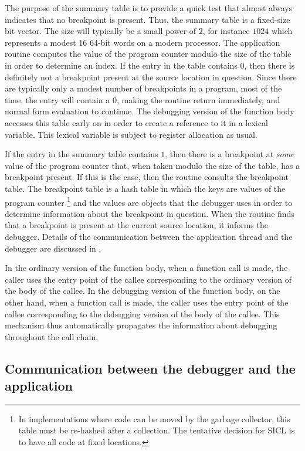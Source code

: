 The purpose of the summary table is to provide a quick test that
almost always indicates that no breakpoint is present.  Thus, the
summary table is a fixed-size bit vector.  The size will typically be
a small power of $2$, for instance $1024$ which represents a modest 16
64-bit words on a modern processor.  The application routine computes
the value of the program counter modulo the size of the table in order
to determine an index.  If the entry in the table contains $0$, then
there is definitely not a breakpoint present at the source location in
question.  Since there are typically only a modest number of
breakpoints in a program, most of the time, the entry will contain a
$0$, making the routine return immediately, and normal form evaluation
to continue.  The debugging version of the function body accesses this
table early on in order to create a reference to it in a lexical
variable.  This lexical variable is subject to register allocation as
usual.

If the entry in the summary table contains $1$, then there is a
breakpoint at \emph{some} value of the program counter that, when
taken modulo the size of the table, has a breakpoint present.  If this
is the case, then the routine consults the breakpoint table.
The breakpoint table is a hash table in which the keys are values of
the program counter%
\footnote{In implementations where code can be moved by the garbage
  collector, this table must be re-hashed after a collection.  The
  tentative decision for SICL is to have all code at fixed locations.}
and the values are objects that the debugger uses in order to
determine information about the breakpoint in question.  When the
routine finds that a breakpoint is present at the current source
location, it informs the debugger.  Details of the communication
between the application thread and the debugger are discussed in
.

In the ordinary version of the function body, when a function call is
made, the caller uses the entry point of the callee corresponding to
the ordinary version of the body of the callee.  In the debugging
version of the function body, on the other hand, when a function call
is made, the caller uses the entry point of the callee corresponding
to the debugging version of the body of the callee.  This mechanism
thus automatically propagates the information about debugging
throughout the call chain.

\subsection{Communication between the debugger and the application}
\label{sec-debugger-application-communication}

